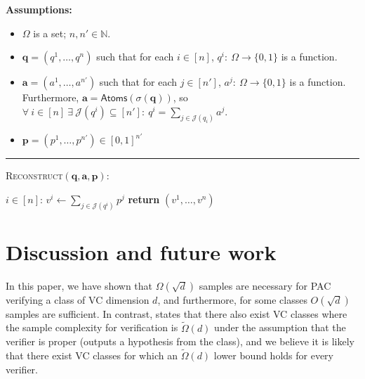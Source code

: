 \documentclass[11pt]{article}
\numberwithin{equation}{section}
\theoremstyle{definition}
\theoremstyle{plain}
\theoremstyle{definition}\newtheorem{notation}[theorem]{Notation}\theoremstyle{plain}\raggedbottom
\newcommand{\roundBrackets}[1]{
	\mathopen{}\left(#1\right)\mathclose{}
}
\newcommand{\customFunctionRound}[2]{
	#1\roundBrackets{#2}
}
\newcommand{\sfFunction}[2]{
	\customFunctionRound{\mathsf{#1}}{#2}
}
\newcommand{\OmegaOf}[1]{\Omega\roundBrackets{#1}}
\newcommand{\BigO}[1]{O\roundBrackets{#1}}
\newcommand{\tildeOmegaOf}[1]{\widetilde{\Omega}\roundBrackets{#1}}
\newcommand{\bbN}{\mathbb{N}}
\newcommand{\cJ}{\mathcal{J}}
\newcommand{\ba}{\mathbf{a}}
\newcommand{\bp}{\mathbf{p}}
\newcommand{\bq}{\mathbf{q}}
\newcommand{\1}{\mathds{1}}
\newcommand{\numQueries}{n}
\newcommand{\numAtoms}{n'}
\newcommand{\atoms}[1]{\sfFunction{Atoms}{#1}}
\newenvironment{ShadedAlgorithmBox}{\begin{tcolorbox}[colback=myLipicsLightGray,colframe=myLipicsLightGray,arc=-1pt]\begin{minipage}{0.975\textwidth}}{\end{minipage}\end{tcolorbox}}
\begin{document}
\begin{protocol}[H]
	\begin{ShadedAlgorithmBox}
		{\bfseries Assumptions:}
		\begin{itemize}
			\item{$\Omega$ is a set; $\numQueries,\numAtoms \in \bbN$.}
			\item{
				$\bq = \left(q^1,\dots,q^{\numQueries}\right)$ such that for each $i \in [\numQueries]$, $q^i:\: \Omega \to \{0,1\}$ is a function.
			}
			\item{
				$\ba = \left(a^1,\dots,a^{\numAtoms}\right)$ such that for each $j \in [\numAtoms]$, $a^j:\: \Omega \to \{0,1\}$ is a function. Furthermore,
				$\ba = \atoms{\sigma(\bq)}$, so $\forall \: i \in [\numQueries]~ \exists \: \cJ(q^i) \subseteq [\numAtoms]: ~ q^i = \sum_{j \in \cJ(q_i)} a^j$.
			}
			\item{
				$\bp = \left(p^1,\dots,p^{\numAtoms}\right) \in [0,1]^{\numAtoms}$
			}
		\end{itemize}
		
		\noindent\rule{\textwidth}{0.5pt}
		
		\vspace*{0.5em}
		
		\textsc{Reconstruct}$(\bq,\ba,\bp)$:
		\begin{algorithmic}
			\For $i \in [\numQueries]$:
				\State $v^i \gets \sum_{j \in \cJ(q^i)} p^j$
			\EndFor
			\State \textbf{return} $(v^1,\dots,v^{\numQueries})$
		\end{algorithmic}
		
	\end{ShadedAlgorithmBox}
	\caption{A subroutine of \cref{protocol:sq-verifier-iteration}. Compute the evaluations for a collection of statistical queries $\bq$ with atoms $\ba$ given evaluations $\bp$ for the atoms.}
	\label{protocol:sq-reconstruct-valuations}
\end{protocol}

\section{Discussion and future work}

In this paper, we have shown that $\OmegaOf{\sqrt{d}}$ samples are necessary for PAC verifying a class of VC dimension $d$, and furthermore, for some classes $\BigO{\sqrt{d}}$ samples are sufficient. In contrast, %
\cite[Lemma 4.1]{GoldwasserRSY21}  %
states that there also exist VC classes where the sample complexity for verification
is $\tildeOmegaOf{d}$ under the assumption that the verifier is proper (outputs a hypothesis from the class), and we believe it is likely that there exist VC classes for which an $\tildeOmegaOf{d}$ lower bound holds for every verifier. 
\end{document}
